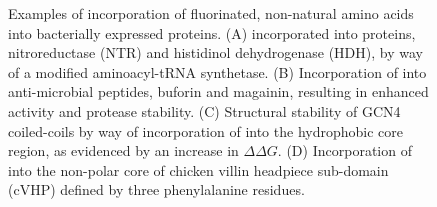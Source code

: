 \begin{refsection}
\begin{figure}[h!]
        {Examples of incorporation of fluorinated, non-natural amino acids
        into bacterially expressed proteins.
        (A)
         incorporated into
         proteins, nitroreductase (NTR) and histidinol
        dehydrogenase (HDH), by way of a modified aminoacyl-tRNA
        synthetase.\cite{Jackson2007}
        (B)
        Incorporation of  into anti-microbial
        peptides, buforin and magainin, resulting in enhanced activity and
        protease stability.\cite{Meng2007}
        (C) Structural stability of GCN4 coiled-coils by way
        of incorporation of  into the hydrophobic
        core region, as evidenced by an increase in ${\Delta\Delta
        G}$.\cite{Lee2004}
        (D)
        Incorporation of  into the non-polar
        core of chicken villin headpiece sub-domain (cVHP) defined by three
        phenylalanine residues.\cite{Woll2006}}
        \label{fig:fluorination_examples}
    \end{figure}


\end{refsection}
